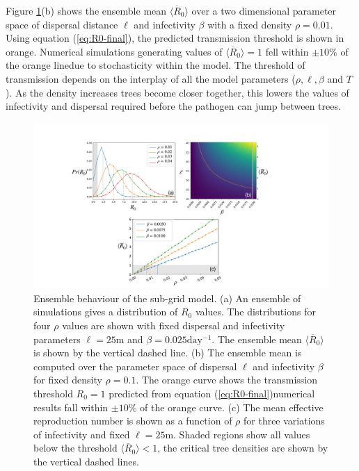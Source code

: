 Figure \ref{fig:sgm-ens}(b) shows the ensemble mean $\langle \overline{R}_0 \rangle$ over a two dimensional parameter space of dispersal distance $\ell$ and infectivity $\beta$ with a fixed density $\rho=0.01$. Using equation (\ref{eq:R0-final}), the predicted transmission threshold is shown in orange. Numerical simulations generating values of $\langle \overline{R}_0 \rangle=1$ fell within $\pm 10\%$ of the orange line\textemdash due to stochasticity within the model. The threshold of transmission depends on the interplay of all the model parameters ($\rho, \ell, \beta$ and $T$). As the density increases trees become closer together, this lowers the values of infectivity and dispersal required before the pathogen can jump between trees.\\

\begin{figure}
\hfill
\centering
\includegraphics[scale=0.35]{chapter5/figures/figure3.pdf}
\caption{Ensemble behaviour of the sub-grid model. (a) An ensemble of simulations gives a distribution of $R_0$ values. The distributions for four $\rho$ values are shown with fixed dispersal and infectivity parameters $\ell=25\textrm{m}$ and $\beta=0.025\mathrm{day^{-1}}$. The ensemble mean $\langle\overline{R}_0 \rangle$ is shown by the vertical dashed line. (b) The ensemble mean is computed over the parameter space of dispersal $\ell$ and infectivity $\beta$ for fixed density $\rho=0.1$. The orange curve shows the transmission threshold $R_0 = 1$ predicted from equation (\ref{eq:R0-final})\textemdash numerical results fall within $\pm 10\%$ of the orange curve. (c) The mean effective reproduction number is shown as a function of $\rho$ for three variations of infectivity and fixed $\ell=25 \mathrm{m}$. Shaded regions show all values below the threshold $\langle\overline{R}_0 \rangle < 1$, the critical tree densities are shown by the vertical dashed lines.}
\label{fig:sgm-ens}
\end{figure}

